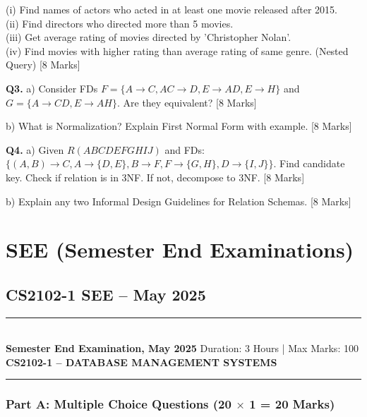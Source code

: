\documentclass[11pt,a4paper]{article}
\newcommand{\examheader}[4]{
\noindent\rule{\textwidth}{0.5pt}\\
\textbf{#1} \hfill Duration: #3 | Max Marks: #4\\
\textbf{#2}\\
\rule{\textwidth}{0.5pt}
\vspace{0.2cm}
}
\begin{document}
(i) Find names of actors who acted in at least one movie released after 2015.\\
(ii) Find directors who directed more than 5 movies.\\
(iii) Get average rating of movies directed by 'Christopher Nolan'.\\
(iv) Find movies with higher rating than average rating of same genre. (Nested Query) \hfill [8 Marks]

\textbf{Q3.} a) Consider FDs $F = \{A \to C, AC \to D, E \to AD, E \to H\}$ and $G = \{A \to CD, E \to AH\}$. Are they equivalent? \hfill [8 Marks]

b) What is Normalization? Explain First Normal Form with example. \hfill [8 Marks]

\textbf{Q4.} a) Given $R(ABCDEFGHIJ)$ and FDs: $\{(A,B) \to C, A \to \{D,E\}, B \to F, F \to \{G,H\}, D \to \{I,J\}\}$. Find candidate key. Check if relation is in 3NF. If not, decompose to 3NF. \hfill [8 Marks]

b) Explain any two Informal Design Guidelines for Relation Schemas. \hfill [8 Marks]

\section{SEE (Semester End Examinations)}

\subsection{CS2102-1 SEE -- May 2025}
\examheader{Semester End Examination, May 2025}{CS2102-1 -- DATABASE MANAGEMENT SYSTEMS}{3 Hours}{100}

\subsubsection*{Part A: Multiple Choice Questions (20 $\times$ 1 = 20 Marks)}
\end{document}
